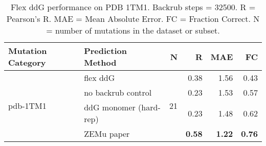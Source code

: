 \begin{table}
  \begin{tabular}{llrrrr}
\toprule
Mutation Category &       Prediction Method &   N &    R &  MAE &   FC \\
\midrule
 \multirow{ 4}{*}{pdb-1TM1} & flex ddG & \multirow{ 4}{*}{21} & 0.38 & 1.56 & 0.43  \\
 & no backrub control & & 0.23 & 1.53 & 0.57  \\
 & ddG monomer (hard-rep) & & 0.23 & 1.48 & 0.62  \\
 & ZEMu paper & & \textbf{0.58} & \textbf{1.22} & \textbf{0.76}  \\
\bottomrule
\end{tabular}
  \caption[Flex ddG performance on PDB 1TM1]{
    Flex ddG performance on PDB 1TM1. Backrub steps = 32500. R = Pearson's R. MAE = Mean Absolute Error. FC = Fraction Correct. N = number of mutations in the dataset or subset.
  } \label{tab:table-pdb-1TM1}
\end{table}
